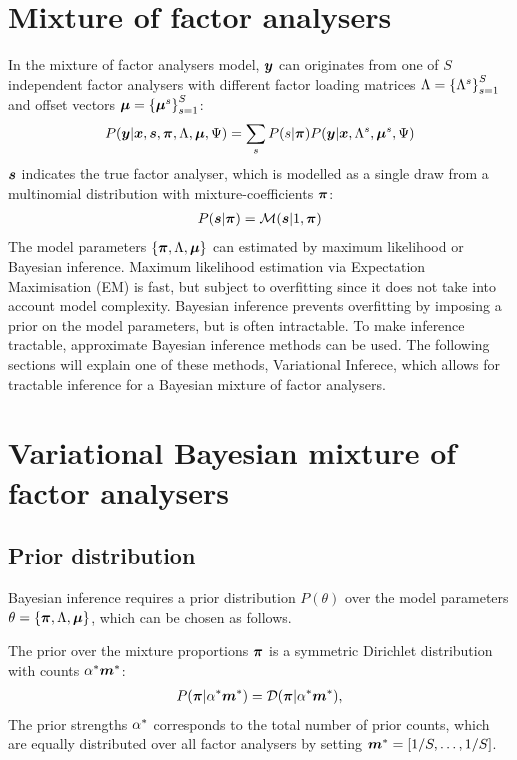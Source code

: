 \documentclass[a4paper]{article}
\begin{document}
\section{Mixture of factor analysers}
In the mixture of factor analysers model, $\boldsymbol{y}$ can originates from one of $S$ independent factor analysers with different factor loading matrices $\Lambda=\left\{\Lambda^s\right\}_{s=1}^S$ and offset vectors $\boldsymbol{\mu}=\left\{\boldsymbol{\mu}^s\right\}_{s=1}^S$:
\begin{align}
  P(\boldsymbol{y}|\boldsymbol{x},\boldsymbol{s},\boldsymbol{\pi},\Lambda,\boldsymbol{\mu},\Psi)=\sum_s P(s|\boldsymbol{\pi}) P(\boldsymbol{y}|\boldsymbol{x},\Lambda^s,\boldsymbol{\mu}^s,\Psi)
\end{align}
$\boldsymbol{s}$ indicates the true factor analyser, which is modelled as a single draw from a multinomial distribution with mixture-coefficients $\boldsymbol{\pi}$:
\begin{align}
  P(\boldsymbol{s}|\boldsymbol{\pi})=\mathcal{M}(\boldsymbol{s}|1,\boldsymbol{\pi})
\end{align}
The model parameters $\left\{\boldsymbol{\pi},\Lambda,\boldsymbol{\mu}\right\}$ can estimated by maximum likelihood or Bayesian inference. Maximum likelihood estimation via Expectation Maximisation (EM) is fast, but subject to overfitting since it does not take into account model complexity. Bayesian inference prevents overfitting by imposing a prior on the model parameters, but is often intractable. To make inference tractable, approximate Bayesian inference methods can be used. The following sections will explain one of these methods, Variational Inferece, which allows for tractable inference for a Bayesian mixture of factor analysers.

\section{Variational Bayesian mixture of factor analysers}
\subsection{Prior distribution}
Bayesian inference requires a prior distribution $P(\theta)$ over the model parameters $\theta=\left\{\boldsymbol{\pi},\Lambda,\boldsymbol{\mu}\right\}$, which can be chosen as follows.

The prior over the mixture proportions $\boldsymbol{\pi}$ is a symmetric Dirichlet distribution with counts $\alpha^*\boldsymbol{m}^*$:
\begin{align}
  P(\boldsymbol{\pi}|\alpha^*\boldsymbol{m}^*)=\mathcal{D}(\boldsymbol{\pi}|\alpha^*\boldsymbol{m}^*),
\end{align}
The prior strengths $\alpha^*$ corresponds to the total number of prior counts, which are equally distributed over all factor analysers by setting $\boldsymbol{m}^*=[1/S,\dots,1/S]$.
\end{document}
